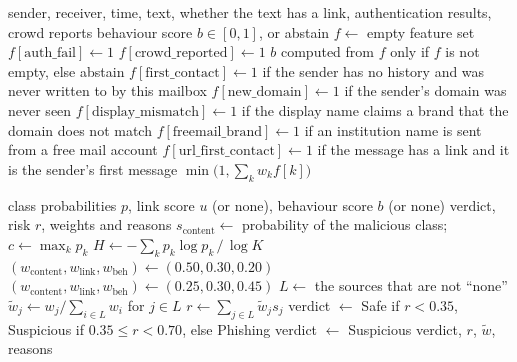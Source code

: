 {\begin{algorithm}[H]
\caption{Behaviour score of an email sender}\label{alg:behaviour}
\begin{algorithmic}[1]
\REQUIRE sender, receiver, time, text, whether the text has a link, authentication results, crowd reports
\ENSURE behaviour score $b \in [0,1]$, or abstain
\STATE $f \leftarrow$ empty feature set
  \STATE $f[\text{auth\_fail}] \leftarrow 1$
\ENDIF
{}
  \STATE $f[\text{crowd\_reported}] \leftarrow 1$
\ENDIF
{}
  \STATE \RETURN $b$ computed from $f$ only if $f$ is not empty, else abstain
\ENDIF
\STATE $f[\text{first\_contact}] \leftarrow 1$ if the sender has no history and was never written to by this mailbox
\STATE $f[\text{new\_domain}] \leftarrow 1$ if the sender's domain was never seen
\STATE $f[\text{display\_mismatch}] \leftarrow 1$ if the display name claims a brand that the domain does not match
\STATE $f[\text{freemail\_brand}] \leftarrow 1$ if an institution name is sent from a free mail account
\STATE $f[\text{url\_first\_contact}] \leftarrow 1$ if the message has a link and it is the sender's first message
\STATE \RETURN $\min\bigl(1, \sum_k w_k f[k]\bigr)$ 
\end{algorithmic}
\end{algorithm}

\begin{algorithm}[H]
\caption{Fusion of channel scores into a verdict}\label{alg:fusion}
\begin{algorithmic}[1]
\REQUIRE class probabilities $p$, link score $u$ (or none), behaviour score $b$ (or none)
\ENSURE verdict, risk $r$, weights and reasons
\STATE $s_{\text{content}} \leftarrow$ probability of the malicious class; $c \leftarrow \max_k p_k$
\STATE $H \leftarrow -\sum_k p_k \log p_k \,/\, \log K$ 
  \STATE $(w_{\text{content}}, w_{\text{link}}, w_{\text{beh}}) \leftarrow (0.50, 0.30, 0.20)$
\ELSE
  \STATE $(w_{\text{content}}, w_{\text{link}}, w_{\text{beh}}) \leftarrow (0.25, 0.30, 0.45)$
\ENDIF
\STATE $L \leftarrow$ the sources that are not ``none''
\STATE $\tilde w_j \leftarrow w_j / \sum_{i \in L} w_i$ for $j \in L$
\STATE $r \leftarrow \sum_{j \in L} \tilde w_j s_j$
\STATE verdict $\leftarrow$ Safe if $r < 0.35$, Suspicious if $0.35 \le r < 0.70$, else Phishing
  \STATE verdict $\leftarrow$ Suspicious 
\ENDIF
\STATE \RETURN verdict, $r$, $\tilde w$, reasons
\end{algorithmic}
\end{algorithm}

}
